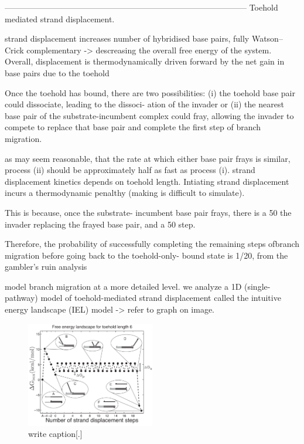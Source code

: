 -----------------------------------------------------------------------------------------
Toehold mediated strand displacement.

strand displacement increases number of hybridised base pairs, fully Watson–Crick
complementary -> descreasing the overall free energy of the system. Overall, displacement
is thermodynamically driven forward by the net gain in base pairs due to the toehold


Once the toehold has bound, there are two possibilities: (i) the toehold base pair could
dissociate, leading to the dissoci- ation of the invader or (ii) the nearest base pair of
the substrate-incumbent complex could fray, allowing the invader to compete to replace
that base pair and complete the first step of branch migration.

as may seem reasonable, that the rate at which either base pair frays is similar, process
(ii) should be approximately half as fast as process (i).  strand displacement kinetics
depends on toehold length.  Intiating strand displacement incurs a thermodynamic penalthy
(making is difficult to simulate).

This is because, once the substrate- incumbent base pair frays, there is a 50%
the invader replacing the frayed base pair, and a 50%
step.

Therefore, the probability of successfully completing the remaining steps ofbranch
migration before going back to the toehold-only- bound state is 1/20, from the gambler’s
ruin analysis

model branch migration at a more detailed level. we analyze a 1D (single-pathway) model
of toehold-mediated strand displacement called the intuitive energy landscape (IEL) model
-> refer to graph on image.


\begin{figure}[ht]
\begin{center}
  \includegraphics[width=0.5\textwidth]{Figures/ToeholdDiagram.png}
  \caption{write caption[.]}
\end{center}
\end{figure}


